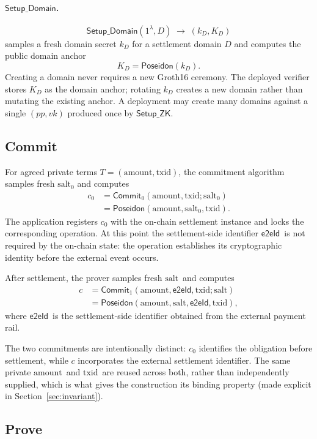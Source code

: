 \documentclass[10pt,twocolumn]{article}
\newcommand{\Poseidon}{\ensuremath{\mathsf{Poseidon}}}
\newcommand{\eeid}{\ensuremath{\mathsf{e2eId}}}
\newcommand{\amount}{\ensuremath{\text{amount}}}
\newcommand{\txid}{\ensuremath{\text{txid}}}
\newcommand{\salt}{\ensuremath{\text{salt}}}
\newcommand{\SetupZK}{\ensuremath{\mathsf{Setup\_ZK}}}
\newcommand{\SetupDomain}{\ensuremath{\mathsf{Setup\_Domain}}}
\newcommand{\Commit}{\ensuremath{\mathsf{Commit}}}
\begin{document}
\paragraph{\SetupDomain.}
\[
\SetupDomain(1^\lambda, D) \;\rightarrow\; (k_D, K_D)
\]
samples a fresh domain secret $k_D$ for a settlement domain $D$ and
computes the public domain anchor
\[
K_D = \Poseidon(k_D).
\]
Creating a domain never requires a new Groth16 ceremony. The deployed
verifier stores $K_D$ as the domain anchor; rotating $k_D$ creates a new
domain rather than mutating the existing anchor. A deployment may create
many domains against a single $(pp,vk)$ produced once by \SetupZK.

\subsection{Commit}

For agreed private terms $T=(\amount,\txid)$, the commitment algorithm
samples fresh $\salt_0$ and computes
\[
\begin{aligned}
c_0 &= \Commit_0(\amount,\txid;\salt_0) \\
    &= \Poseidon(\amount,\salt_0,\txid).
\end{aligned}
\]
The application registers $c_0$ with the on-chain settlement instance and
locks the corresponding operation. At this point the settlement-side
identifier \eeid\ is not required by the on-chain state: the operation
establishes its cryptographic identity before the external event occurs.

After settlement, the prover samples fresh \salt\ and computes
\[
\begin{aligned}
c &= \Commit_1(\amount,\eeid,\txid;\salt) \\
  &= \Poseidon(\amount,\salt,\eeid,\txid),
\end{aligned}
\]
where \eeid\ is the settlement-side identifier obtained from the external
payment rail.

The two commitments are intentionally distinct: $c_0$ identifies the
obligation before settlement, while $c$ incorporates the external
settlement identifier. The same private \amount\ and \txid\ are reused
across both, rather than independently supplied, which is what gives the
construction its binding property (made explicit in
Section~\ref{sec:invariant}).

\subsection{Prove}
\label{sec:prove}
\end{document}
